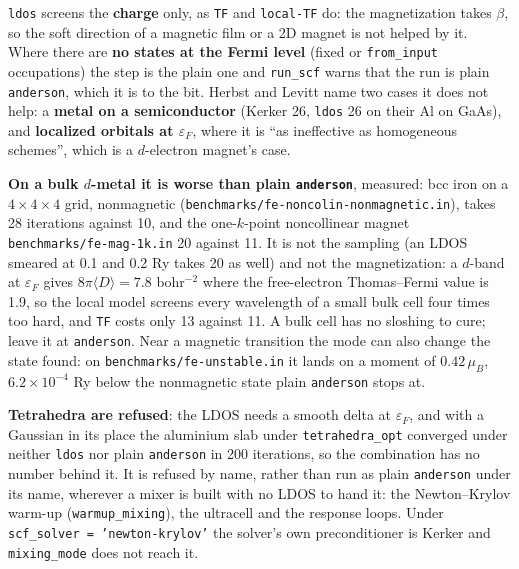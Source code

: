 \documentclass[11pt,a4paper]{article}
\newcommand{\code}[1]{\texttt{\small #1}}
\begin{document}
\begin{refuses}
\code{ldos} screens the \textbf{charge} only, as \code{TF} and \code{local-TF} do: the
magnetization takes $\beta$, so the soft direction of a magnetic film or a 2D magnet is
not helped by it. Where there are \textbf{no states at the Fermi level} (fixed or
\code{from\_input} occupations) the step is the plain one and \code{run\_scf} warns that
the run is plain \code{anderson}, which it is to the bit. Herbst and Levitt name two
cases it does not help: a \textbf{metal on a semiconductor} (Kerker 26, \code{ldos} 26
on their Al on GaAs), and \textbf{localized orbitals at $\varepsilon_F$}, where it is
``as ineffective as homogeneous schemes'', which is a $d$-electron magnet's case.

\textbf{On a bulk $d$-metal it is worse than plain \code{anderson}}, measured: bcc iron
on a $4\times4\times4$ grid, nonmagnetic (\code{benchmarks/fe-noncolin-nonmagnetic.in}),
takes 28 iterations against 10, and the one-$k$-point noncollinear magnet
\code{benchmarks/fe-mag-1k.in} 20 against 11. It is not the sampling (an LDOS smeared at
0.1 and 0.2 Ry takes 20 as well) and not the magnetization: a $d$-band at
$\varepsilon_F$ gives $8\pi\langle D\rangle = 7.8$ bohr$^{-2}$ where the free-electron
Thomas--Fermi value is 1.9, so the local model screens every wavelength of a small
bulk cell four times too hard, and \code{TF} costs only 13 against 11. A bulk cell has
no sloshing to cure; leave it at \code{anderson}. Near a magnetic transition the mode
can also change the state found: on \code{benchmarks/fe-unstable.in} it lands on a
moment of $0.42\,\mu_B$, $6.2\times10^{-4}$ Ry below the nonmagnetic state plain
\code{anderson} stops at.

\textbf{Tetrahedra are refused}: the LDOS needs a smooth delta at $\varepsilon_F$, and
with a Gaussian in its place the aluminium slab under \code{tetrahedra\_opt} converged
under neither \code{ldos} nor plain \code{anderson} in 200 iterations, so the combination
has no number behind it. It is refused by name, rather than run as plain
\code{anderson} under its name, wherever a mixer is built with no LDOS to hand it: the
Newton--Krylov warm-up (\code{warmup\_mixing}), the ultracell and the response loops.
Under \code{scf\_solver = 'newton-krylov'} the solver's own preconditioner is Kerker and
\code{mixing\_mode} does not reach it.
\end{refuses}
\end{document}
